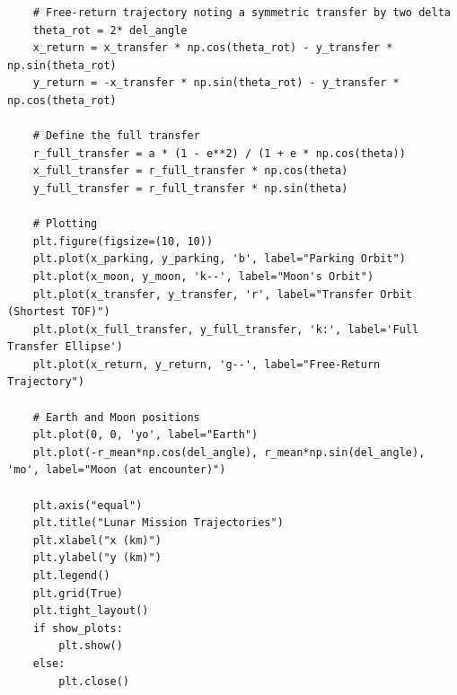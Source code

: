 \documentclass[12pt,twocolumn]{article}  %
\begin{document}
\begin{lstlisting}
    # Free-return trajectory noting a symmetric transfer by two delta
    theta_rot = 2* del_angle
    x_return = x_transfer * np.cos(theta_rot) - y_transfer * np.sin(theta_rot)
    y_return = -x_transfer * np.sin(theta_rot) - y_transfer * np.cos(theta_rot)
    
    # Define the full transfer 
    r_full_transfer = a * (1 - e**2) / (1 + e * np.cos(theta))
    x_full_transfer = r_full_transfer * np.cos(theta)
    y_full_transfer = r_full_transfer * np.sin(theta)
    
    # Plotting
    plt.figure(figsize=(10, 10))
    plt.plot(x_parking, y_parking, 'b', label="Parking Orbit")
    plt.plot(x_moon, y_moon, 'k--', label="Moon's Orbit")
    plt.plot(x_transfer, y_transfer, 'r', label="Transfer Orbit (Shortest TOF)")
    plt.plot(x_full_transfer, y_full_transfer, 'k:', label='Full Transfer Ellipse')
    plt.plot(x_return, y_return, 'g--', label="Free-Return Trajectory")
    
    # Earth and Moon positions
    plt.plot(0, 0, 'yo', label="Earth")
    plt.plot(-r_mean*np.cos(del_angle), r_mean*np.sin(del_angle), 'mo', label="Moon (at encounter)")
    
    plt.axis("equal")
    plt.title("Lunar Mission Trajectories")
    plt.xlabel("x (km)")
    plt.ylabel("y (km)")
    plt.legend()
    plt.grid(True)
    plt.tight_layout()
    if show_plots:
        plt.show()
    else:
        plt.close()
        
            

\end{lstlisting}
\end{document}
